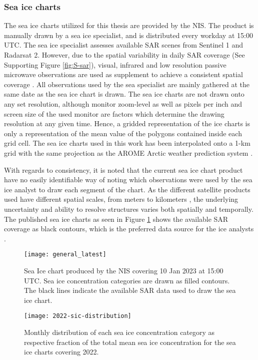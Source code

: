 \documentclass[../main/thesis.tex]{subfiles}
\begin{document}
\subsubsection{Sea ice charts}
\label{sec:sea-ice-charts}
The sea ice charts utilized for this thesis are provided by the NIS. The product is manually drawn by a sea ice specialist, and is distributed every workday at 15:00 UTC. The sea ice specialist assesses available SAR scenes from Sentinel 1 and Radarsat 2. However, due to the spatial variability in daily SAR coverage (See Supporting Figure \ref{fig:S-sar}), visual, infrared and low resolution passive microwave observations are used as supplement to achieve a consistent spatial coverage \citep{Dinessen2020}. All observations used by the sea specialist are mainly gathered at the same date as the sea ice chart is drawn. The sea ice charts are not drawn onto any set resolution, although monitor zoom-level as well as pixels per inch and screen size of the used monitor are factors which determine the drawing resolution at any given time. Hence, a gridded representation of the ice charts is only a representation of the mean value of the polygons contained inside each grid cell. The sea ice charts used in this work has been interpolated onto a 1-km grid with the same projection as the AROME Arctic weather prediction system \citep{Mueller2017}.

With regards to consistency, it is noted that the current sea ice chart product have no easily identifiable way of noting which observations were used by the sea ice analyst to draw each segment of the chart. As the different satellite products used have different spatial scales, from meters to kilometers \citep{Dinessen2020}, the underlying uncertainty and ability to resolve structures varies both spatially and temporally. The published sea ice charts as seen in Figure \ref{fig:icechart} shows the available SAR coverage as black contours, which is the preferred data source for the ice analysts \citep{Dinessen2020}. 

\begin{figure}
    \centering
    \texttt{[image: general\_latest]}
    \caption{\label{fig:icechart}Sea Ice chart produced by the NIS covering 10 Jan 2023 at 15:00 UTC. Sea ice concentration categories are drawn as filled contours. The black lines indicate the available SAR data used to draw the sea ice chart.}
\end{figure}

\begin{figure}
    \centering
    \texttt{[image: 2022-sic-distribution]}
    \caption{\label{fig:2022-areadist-sic}Monthly distribution of each sea ice concentration category as respective fraction of the total mean sea ice concentration for the sea ice charts covering 2022.}
\end{figure}
\end{document}
